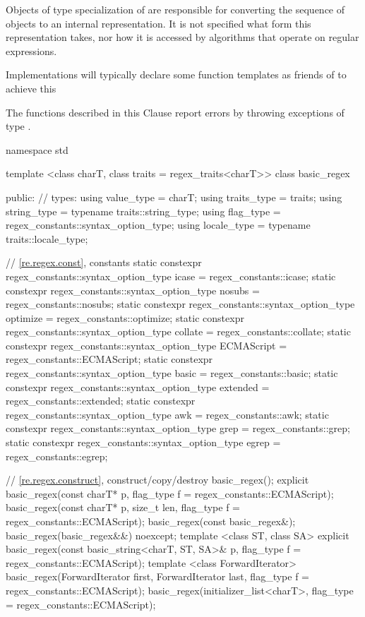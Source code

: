 \pnum
Objects of type specialization of  are responsible for
converting the sequence of  objects to an internal
representation. It is not specified what form this representation
takes, nor how it is accessed by algorithms that operate on regular
expressions. \begin{note} Implementations will typically declare
some function templates as friends of  to achieve
this \end{note}

\pnum
{}%
The functions described in this Clause report errors by throwing
exceptions of type .

%
\begin{codeblock}
namespace std {
  template <class charT,
            class traits = regex_traits<charT>>
  class basic_regex {
  public:
    // types:
    using value_type  =          charT;
    using traits_type =          traits;
    using string_type = typename traits::string_type;
    using flag_type   =          regex_constants::syntax_option_type;
    using locale_type = typename traits::locale_type;

    // \ref{re.regex.const}, constants
    static constexpr regex_constants::syntax_option_type
      icase = regex_constants::icase;
    static constexpr regex_constants::syntax_option_type
      nosubs = regex_constants::nosubs;
    static constexpr regex_constants::syntax_option_type
      optimize = regex_constants::optimize;
    static constexpr regex_constants::syntax_option_type
      collate = regex_constants::collate;
    static constexpr regex_constants::syntax_option_type
      ECMAScript = regex_constants::ECMAScript;
    static constexpr regex_constants::syntax_option_type
      basic = regex_constants::basic;
    static constexpr regex_constants::syntax_option_type
      extended = regex_constants::extended;
    static constexpr regex_constants::syntax_option_type
      awk = regex_constants::awk;
    static constexpr regex_constants::syntax_option_type
      grep = regex_constants::grep;
    static constexpr regex_constants::syntax_option_type
      egrep = regex_constants::egrep;

    // \ref{re.regex.construct}, construct/copy/destroy
    basic_regex();
    explicit basic_regex(const charT* p,
      flag_type f = regex_constants::ECMAScript);
    basic_regex(const charT* p, size_t len, flag_type f = regex_constants::ECMAScript);
    basic_regex(const basic_regex&);
    basic_regex(basic_regex&&) noexcept;
    template <class ST, class SA>
      explicit basic_regex(const basic_string<charT, ST, SA>& p,
                           flag_type f = regex_constants::ECMAScript);
    template <class ForwardIterator>
      basic_regex(ForwardIterator first, ForwardIterator last,
                  flag_type f = regex_constants::ECMAScript);
    basic_regex(initializer_list<charT>,
      flag_type = regex_constants::ECMAScript);

}}
\end{codeblock}
